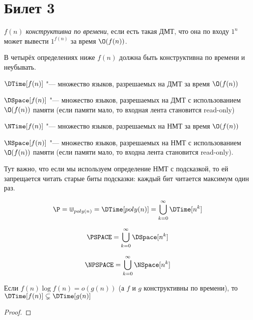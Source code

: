 \setcounter{section}{2}
\section{Билет 3}
	\begin{Def}
		$f(n)$ \textit{конструктивна по времени}, если есть такая ДМТ, что она по входу $1^n$
		может вывести $1^{f(n)}$ за время $\O(f(n))$.
	\end{Def}
	\begin{Rem}
		В четырёх определениях ниже $f(n)$ должна быть конструктивна по времени и неубывать.
	\end{Rem}
	\begin{Def}
		$\DTime[f(n)]$ "--- множество языков, разрешаемых на ДМТ за время $\O(f(n))$
	\end{Def}
	\begin{Def}
		$\DSpace[f(n)]$ "--- множество языков, разрешаемых на ДМТ с использованием $\O(f(n))$ памяти (если памяти мало, то входная лента становится read-only)
	\end{Def}
	\begin{Def}
		$\NTime[f(n)]$ "--- множество языков, разрешаемых на НМТ за время $\O(f(n))$
	\end{Def}
	\begin{Def}
		$\NSpace[f(n)]$ "--- множество языков, разрешаемых на НМТ с использованием $\O(f(n))$ памяти (если памяти мало, то входна лента становится read-only).
	\end{Def}
	\begin{Rem}
		Тут важно, что если мы используем определение НМТ с подсказкой, то ей запрещается читать старые биты подсказки: каждый
		бит читается максимум один раз.
	\end{Rem}

	\begin{exmp}
		\[ \P = \Cup_{poly(n)} = \DTime[poly(n)] = \bigcup\limits_{k=0}^{\infty} \DTime[n^k] \]
	\end{exmp}
	\begin{Def}
		\[ \PSPACE = \bigcup\limits_{k=0}^\infty \DSpace[n^k] \]
	\end{Def}
	\begin{Def}
		\[ \NPSPACE = \bigcup\limits_{k=0}^\infty \NSpace[n^k] \]
	\end{Def}

	\begin{theorem}
		Если $f(n) \log f(n) = o(g(n))$ (а $f$ и $g$ конструктивны по времени), то $\DTime[f(n)] \subsetneq \DTime[g(n)]$
	\end{theorem}
	\begin{proof}
		\TODO
	\end{proof}

